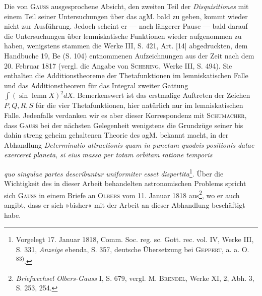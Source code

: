 Die von \textsc{Gauss} ausgesprochene Absicht, den zweiten Teil der \textit{Disquisitiones}
mit einem Teil seiner Untersuchungen über das agM. bald zu geben, kommt
wieder nicht zur Ausführung. Jedoch scheint er — nach längerer Pause —
bald darauf die Untersuchungen über lemniskatische Funktionen wieder aufgenommen
zu haben, wenigstens stammen die Werke III, S. 421, Art. [14]
abgedruckten, dem Handbuche 19, Be (S. 104) entnommenen Aufzeichnungen
aus der Zeit nach dem 20. Februar 1817 (vergl. die Angabe von \textsc{Schering},
Werke III, S. 494). Sie enthalten die Additionstheoreme der Thetafunktionen
im lemniskatischen Falle und das Additionstheorem für das Integral zweiter
Gattung \(\int(\sin\operatorname{lemn}X)^2dX\). Bemerkenswert ist das erstmalige Auftreten der
Zeichen \(P,Q,R,S\) für die vier Thetafunktionen, hier natürlich nur im lemniskatischen
Falle. Jedenfalls verdanken wir es aber dieser Korrespondenz mit
\textsc{Schumacher}, dass \textsc{Gauss} bei der nächsten Gelegenheit wenigstens die Grundzüge
seiner bis dahin streng geheim gehaltenen Theorie des agM. bekannt
macht, in der Abhandlung \textit{Determinatio attractionis quam in punctum quodvis
positionis datae exerceret planeta, si eius massa per totam orbitam ratione temporis}
\par\clearpage{}
\noindent\textit{quo singulae partes describuntur uniformiter esset dispertita}\footnote{Vorgelegt 17. Januar 1818, Comm. Soc. reg. sc. Gott. rec. vol. IV, Werke III, S. 331, \textit{Anzeige} ebenda, S. 357, deutsche Übersetzung bei \textsc{Geppert}, a. a. O. \textsuperscript{83)}.}. Über die Wichtigkeit
des in dieser Arbeit behandelten astronomischen Problems spricht sich
\textsc{Gauss} in einem Briefe an \textsc{Olbers} vom 11. Januar 1818 aus\footnote{\textit{Briefwechsel Olbers-Gauss} I, S. 679, vergl. \textsc{M. Brendel}, Werke XI, 2, Abh. 3, S. 253, 254.}, wo er auch
angibt, dass er sich »bisher« mit der Arbeit an dieser Abhandlung beschäftigt
habe.

